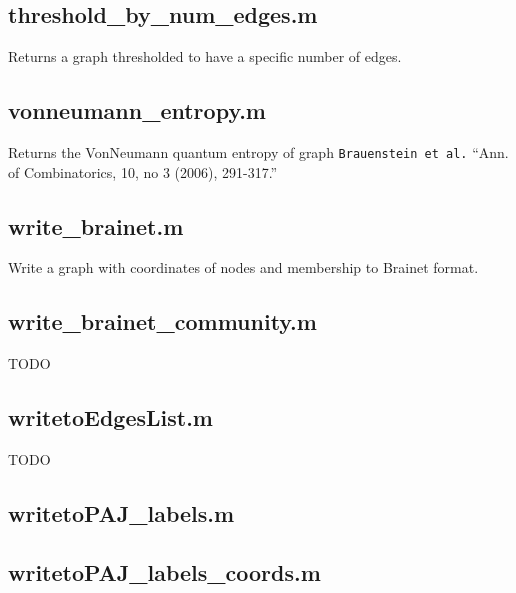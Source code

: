 \documentclass[a4paper]{report}
\begin{document}
  \subsection*{threshold\_by\_num\_edges.m} Returns a graph thresholded to
  have a specific number of edges.

  \subsection*{vonneumann\_entropy.m} Returns the VonNeumann quantum entropy
  of graph \texttt{Brauenstein\ et\ al.} ``Ann. of Combinatorics, 10, no
  3 (2006), 291-317.''

  \subsection*{write\_brainet.m} Write a graph with coordinates of nodes and
  membership to Brainet format.

  \subsection*{write\_brainet\_community.m} TODO

  \subsection*{writetoEdgesList.m} TODO

  \subsection*{writetoPAJ\_labels.m}

  \subsection*{writetoPAJ\_labels\_coords.m}
 
\end{document}

